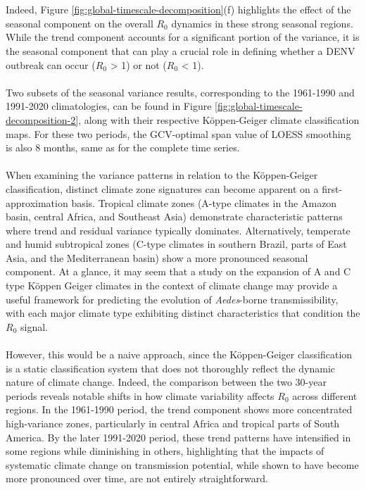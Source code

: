 \documentclass[10pt,twocolumn]{wlscirep}
\begin{document}
\\
\\
Indeed, Figure \ref{fig:global-timescale-decomposition}(f) highlights the effect of the seasonal component on the overall $R_0$ dynamics in these strong seasonal regions. While the trend component accounts for a significant portion of the variance, it is the seasonal component that can play a crucial role in defining whether a DENV outbreak can occur ($R_0$ > 1) or not ($R_0$ < 1).
\\
\\
Two subsets of the seasonal variance results, corresponding to the 1961-1990 and 1991-2020 climatologies, can be found in Figure \ref{fig:global-timescale-decomposition-2}, along with their respective Köppen-Geiger climate classification maps\cite{beck_2023}. For these two periods, the GCV-optimal span value of LOESS smoothing is also 8 months, same as for the complete time series.
\\
\\
When examining the variance patterns in relation to the Köppen-Geiger classification, distinct climate zone signatures can become apparent on a first-approximation basis. Tropical climate zones (A-type climates in the Amazon basin, central Africa, and Southeast Asia) demonstrate characteristic patterns where trend and residual variance typically dominates. Alternatively, temperate and humid subtropical zones (C-type climates in southern Brazil, parts of East Asia, and the Mediterranean basin) show a more pronounced seasonal component. At a glance, it may seem that a study on the expansion of A and C type Köppen Geiger climates in the context of climate change may provide a useful framework for predicting the evolution of \textit{Aedes}-borne transmissibility, with each major climate type exhibiting distinct characteristics that condition the $R_0$ signal.
\\
\\
However, this would be a naive approach, since the Köppen-Geiger classification is a static classification system that does not thoroughly reflect the dynamic nature of climate change\cite{triantafyllou_1994}. Indeed, the comparison between the two 30-year periods reveals notable shifts in how climate variability affects $R_0$ across different regions. In the 1961-1990 period, the trend component shows more concentrated high-variance zones, particularly in central Africa and tropical parts of South America. By the later 1991-2020 period, these trend patterns have intensified in some regions while diminishing in others, highlighting that the impacts of systematic climate change on transmission potential, while shown to have become more pronounced over time, are not entirely straightforward.
\end{document}

